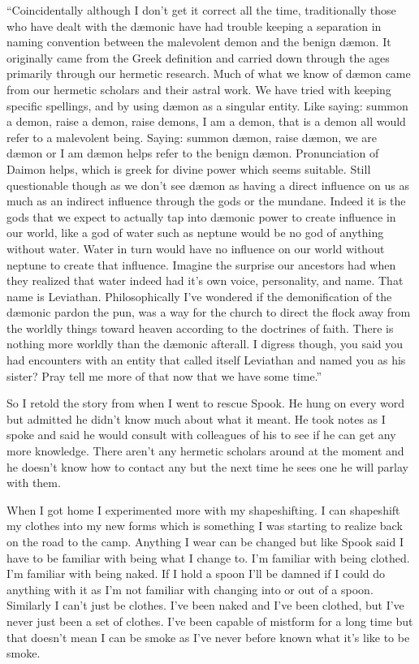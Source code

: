 ``Coincidentally although I don't get it correct all the time, traditionally those who have dealt with the d\ae monic have had trouble keeping a separation in naming convention between the malevolent demon and the benign d\ae mon. It originally came from the Greek definition and carried down through the ages primarily through our hermetic research. Much of what we know of d\ae mon came from our hermetic scholars and their astral work. We have tried with keeping specific spellings, and by using d\ae mon as a singular entity. Like saying: summon a demon, raise a demon, raise demons, I am a demon, that is a demon all would refer to a malevolent being. Saying: summon d\ae mon, raise d\ae mon, we are d\ae mon or I am d\ae mon helps refer to the benign d\ae mon. Pronunciation of Daimon helps, which is greek for divine power which seems suitable. Still questionable though as we don't see d\ae mon as having a direct influence on us as much as an indirect influence through the gods or the mundane. Indeed it is the gods that we expect to actually tap into d\ae monic power to create influence in our world, like a god of water such as neptune would be no god of anything without water. Water in turn would have no influence on our world without neptune to create that influence. Imagine the surprise our ancestors had when they realized that water indeed had it's own voice, personality, and name. That name is Leviathan. Philosophically I've wondered if the demonification of the d\ae monic pardon the pun, was a way for the church to direct the flock away from the worldly things toward heaven according to the doctrines of faith. There is nothing more worldly than the d\ae monic afterall. I digress though, you said you had encounters with an entity that called itself Leviathan and named you as his sister? Pray tell me more of that now that we have some time.''

So I retold the story from when I went to rescue Spook. He hung on every word but admitted he didn't know much about what it meant. He took notes as I spoke and said he would consult with colleagues of his to see if he can get any more knowledge. There aren't any hermetic scholars around at the moment and he doesn't know how to contact any but the next time he sees one he will parlay with them.

When I got home I experimented more with my shapeshifting. I can shapeshift my clothes into my new forms which is something I was starting to realize back on the road to the camp. Anything I wear can be changed but like Spook said I have to be familiar with being what I change to. I'm familiar with being clothed. I'm familiar with being naked. If I hold a spoon I'll be damned if I could do anything with it as I'm not familiar with changing into or out of a spoon. Similarly I can't just be clothes. I've been naked and I've been clothed, but I've never just been a set of clothes. I've been capable of mistform for a long time but that doesn't mean I can be smoke as I've never before known what it's like to be smoke. 

